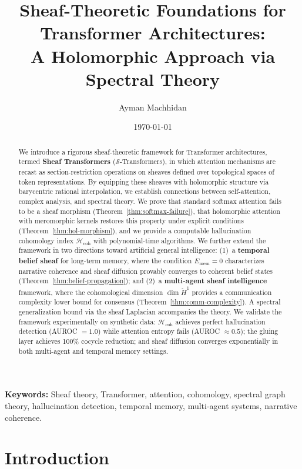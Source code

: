 \documentclass[11pt,a4paper]{article}
\title{\textbf{Sheaf-Theoretic Foundations for Transformer Architectures:}\\[0.3em]
\large A Holomorphic Approach via Spectral Theory}
\author{Ayman Machhidan}
\date{\today}
\theoremstyle{plain}
\theoremstyle{definition}
\theoremstyle{remark}
\newcommand{\cS}{\mathcal{S}}
\newcommand{\Hcoh}{\mathcal{H}_{\mathrm{coh}}}
\newcommand{\CechH}{\check{H}}
\begin{document}
\maketitle

\begin{abstract}
We introduce a rigorous sheaf-theoretic framework for Transformer architectures, termed \textbf{Sheaf Transformers} ($\cS$-Transformers), in which attention mechanisms are recast as section-restriction operations on sheaves defined over topological spaces of token representations. By equipping these sheaves with holomorphic structure via barycentric rational interpolation, we establish connections between self-attention, complex analysis, and spectral theory. We prove that standard softmax attention fails to be a sheaf morphism (Theorem~\ref{thm:softmax-failure}), that holomorphic attention with meromorphic kernels restores this property under explicit conditions (Theorem~\ref{thm:hol-morphism}), and we provide a computable hallucination cohomology index $\Hcoh$ with polynomial-time algorithms. We further extend the framework in two directions toward artificial general intelligence: (1)~a \textbf{temporal belief sheaf} for long-term memory, where the condition $E_{\mathrm{mem}} = 0$ characterizes narrative coherence and sheaf diffusion provably converges to coherent belief states (Theorem~\ref{thm:belief-propagation}); and (2)~a \textbf{multi-agent sheaf intelligence} framework, where the cohomological dimension $\dim\CechH^1$ provides a communication complexity lower bound for consensus (Theorem~\ref{thm:comm-complexity}). A spectral generalization bound via the sheaf Laplacian accompanies the theory. We validate the framework experimentally on synthetic data: $\Hcoh$ achieves perfect hallucination detection (AUROC $= 1.0$) while attention entropy fails (AUROC $\approx 0.5$); the gluing layer achieves 100\% cocycle reduction; and sheaf diffusion converges exponentially in both multi-agent and temporal memory settings.
\end{abstract}

\noindent\textbf{Keywords:} Sheaf theory, Transformer, attention, cohomology, spectral graph theory, hallucination detection, temporal memory, multi-agent systems, narrative coherence.

\tableofcontents
\newpage

\section{Introduction}\label{sec:intro}
\end{document}
